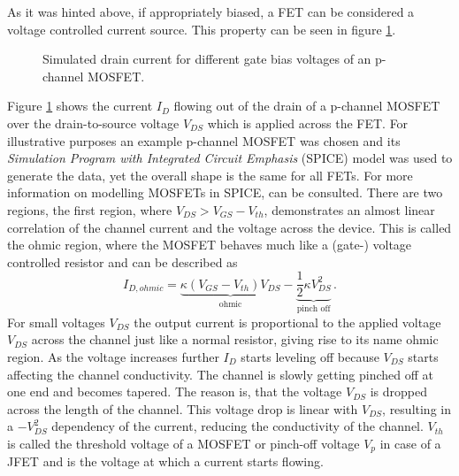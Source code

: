 As it was hinted above, if appropriately biased, a FET can be considered a voltage controlled current source. This property can be seen in figure \ref{fig:fet_curret_gate_bias}.

\begin{figure}[hb]
    \centering
    
    \caption{Simulated drain current for different gate bias voltages of an  p-channel MOSFET.}
    \label{fig:fet_curret_gate_bias}
\end{figure}

Figure \ref{fig:fet_curret_gate_bias} shows the current $I_D$ flowing out of the drain of a p-channel MOSFET over the drain-to-source voltage $V_{DS}$ which is applied across the FET. For illustrative purposes an example p-channel MOSFET was chosen and its \textit{Simulation Program with Integrated Circuit Emphasis} (SPICE) model \cite{irf9610_spice,irf9610_spice_better} was used to generate the data, yet the overall shape is the same for all FETs. For more information on modelling MOSFETs in SPICE, \citep[p. 442]{spice_mosfets} can be consulted. There are two regions, the first region, where $V_{DS} > V_{GS} - V_{th}$, demonstrates an almost linear correlation of the channel current and the voltage across the device. This is called the ohmic region, where the MOSFET behaves much like a (gate-) voltage controlled resistor and can be described \cite{shockley_fet_equations} as
\begin{equation}
    I_{D,ohmic} = \underbrace{\kappa (V_{GS} - V_{th}) V_{DS}}_{\text{ohmic}} - \underbrace{\frac 1 2 \kappa V_{DS}^2}_{\text{pinch off}} \, .
\end{equation}
For small voltages $V_{DS}$ the output current is proportional to the applied voltage $V_{DS}$ across the channel just like a normal resistor, giving rise to its name ohmic region. As the voltage increases further $I_D$ starts leveling off because $V_{DS}$ starts affecting the channel conductivity. The channel is slowly getting pinched off at one end and becomes tapered. The reason is, that the voltage $V_{DS}$ is dropped across the length of the channel. This voltage drop is linear with $V_{DS}$, resulting in a $-V_{DS}^2$ dependency of the current, reducing the conductivity of the channel. $V_{th}$ is called the threshold voltage of a MOSFET or pinch-off voltage $V_p$ in case of a JFET and is the voltage at which a current starts flowing.

